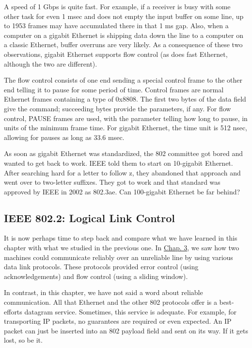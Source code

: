 \documentclass[b5paper,11pt]{memoir}
\begin{document}
A speed of 1 Gbps is quite fast. For example, if a receiver is busy with
some other task for even 1 msec and does not empty the input buffer on
some line, up to 1953 frames may have accumulated there in that 1 ms
gap. Also, when a computer on a gigabit Ethernet is shipping data down
the line to a computer on a classic Ethernet, buffer overruns are very
likely. As a consequence of these two observations, gigabit Ethernet
supports flow control (as does fast Ethernet, although the two are
different).

The flow control consists of one end sending a special control frame to
the other end telling it to pause for some period of time. Control
frames are normal Ethernet frames containing a type of 0x8808. The first
two bytes of the data field give the command; succeeding bytes provide
the parameters, if any. For flow control, PAUSE frames are used, with
the parameter telling how long to pause, in units of the minimum frame
time. For gigabit Ethernet, the time unit is 512 nsec, allowing for
pauses as long as 33.6 msec.

As soon as gigabit Ethernet was standardized, the 802 committee got
bored and wanted to get back to work. IEEE told them to start on
10-gigabit Ethernet. After searching hard for a letter to follow z, they
abandoned that approach and went over to two-letter suffixes. They got
to work and that standard was approved by IEEE in 2002 as 802.3ae. Can
100-gigabit Ethernet be far behind?

\protect\hypertarget{0130661023_ch04lev1sec3.htmlux5cux23ch04lev2sec17}{}{}

\subsection{IEEE 802.2: Logical Link Control}

It is now perhaps time to step back and compare what we have learned in
this chapter with what we studied in the previous one. In
\protect\hyperlink{0130661023_ch03.htmlux5cux23ch03}{Chap. 3}, we saw
how two machines could communicate reliably over an unreliable line by
using various data link protocols. These protocols provided error
control (using acknowledgements) and flow control (using a sliding
window).

In contrast, in this chapter, we have not said a word about reliable
communication. All that Ethernet and the other 802 protocols offer is a
best-efforts datagram service. Sometimes, this service is adequate. For
example, for transporting IP packets, no guarantees are required or even
expected. An IP packet can just be inserted into an 802 payload field
and sent on its way. If it gets lost, so be it.
\end{document}

